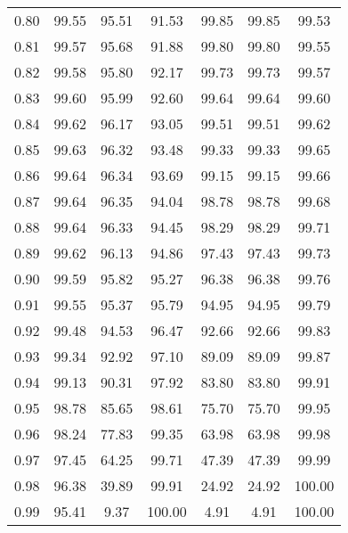 \begin{tabular}{|c|c|c|c|c|c|c|}
      0.80 &     99.55 &     95.51 &      91.53 &   99.85 &      99.85 &         99.53 \\
      0.81 &     99.57 &     95.68 &      91.88 &   99.80 &      99.80 &         99.55 \\
      0.82 &     99.58 &     95.80 &      92.17 &   99.73 &      99.73 &         99.57 \\
      0.83 &     99.60 &     95.99 &      92.60 &   99.64 &      99.64 &         99.60 \\
      0.84 &     99.62 &     96.17 &      93.05 &   99.51 &      99.51 &         99.62 \\
      0.85 &     99.63 &     96.32 &      93.48 &   99.33 &      99.33 &         99.65 \\
      0.86 &     99.64 &     96.34 &      93.69 &   99.15 &      99.15 &         99.66 \\
      0.87 &     99.64 &     96.35 &      94.04 &   98.78 &      98.78 &         99.68 \\
      0.88 &     99.64 &     96.33 &      94.45 &   98.29 &      98.29 &         99.71 \\
      0.89 &     99.62 &     96.13 &      94.86 &   97.43 &      97.43 &         99.73 \\
      0.90 &     99.59 &     95.82 &      95.27 &   96.38 &      96.38 &         99.76 \\
      0.91 &     99.55 &     95.37 &      95.79 &   94.95 &      94.95 &         99.79 \\
      0.92 &     99.48 &     94.53 &      96.47 &   92.66 &      92.66 &         99.83 \\
      0.93 &     99.34 &     92.92 &      97.10 &   89.09 &      89.09 &         99.87 \\
      0.94 &     99.13 &     90.31 &      97.92 &   83.80 &      83.80 &         99.91 \\
      0.95 &     98.78 &     85.65 &      98.61 &   75.70 &      75.70 &         99.95 \\
      0.96 &     98.24 &     77.83 &      99.35 &   63.98 &      63.98 &         99.98 \\
      0.97 &     97.45 &     64.25 &      99.71 &   47.39 &      47.39 &         99.99 \\
      0.98 &     96.38 &     39.89 &      99.91 &   24.92 &      24.92 &        100.00 \\
      0.99 &     95.41 &      9.37 &     100.00 &    4.91 &       4.91 &        100.00 \\
\bottomrule
\end{tabular}
